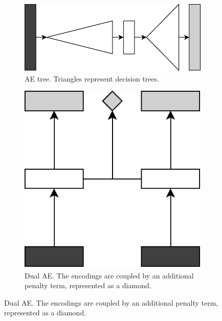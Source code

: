 \begin{figure}[ht!]
  \centering
  \begin{subfigure}[t]{\figwidth}
    \centering
    \includegraphics[width=0.6\figwidth]{ArchTreeAE.pdf}
    \caption{\label{Fig.AETree}AE tree. Triangles represent decision trees.}
  \end{subfigure}

  \vspace{.5em}
  
  \begin{subfigure}[t]{\figwidth}
    \centering
    \includegraphics[width=0.4\figwidth]{ArchDualAE.pdf}
    \caption{\label{Fig.DualAE}Dual AE. The encodings are coupled by an additional penalty term, represented as a diamond.}
  \end{subfigure}

  \vspace{.5em}
  

\end{figure}
